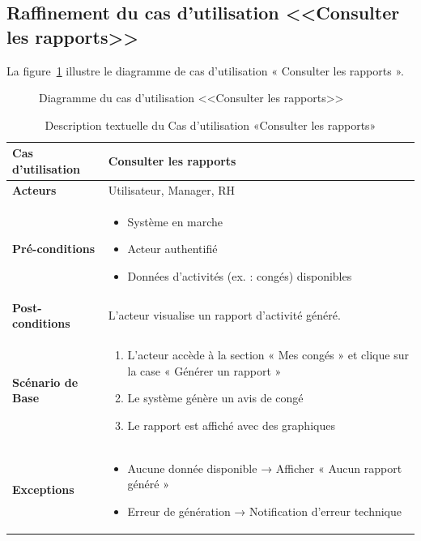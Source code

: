     \subsection{Raffinement du cas d'utilisation <<Consulter les rapports>>}
La figure~\ref{fig:rapports} illustre le diagramme de cas d’utilisation « Consulter les rapports ».
\begin{figure}[h]
    \centering
    \caption{Diagramme du cas d'utilisation <<Consulter les rapports>>}
    \label{fig:rapports}
\end{figure}
\newpage
\begin{table}[!ht]
    \centering
    \caption{Description textuelle du Cas d’utilisation «Consulter les rapports»}
    \label{tab:consult_reports}
    \renewcommand{\arraystretch}{1.2}
    \begin{tabular}{|p{4.2cm}|p{11cm}|}
    \hline
    \textbf{Cas d'utilisation} & Consulter les rapports \\
    \hline
    \textbf{Acteurs} & Utilisateur, Manager, RH \\
    \hline
    \textbf{Pré-conditions} & 
    \begin{itemize}
    \item Système en marche
    \item Acteur authentifié
    \item Données d’activités (ex. : congés) disponibles
    \end{itemize} \\
    \hline
    \textbf{Post-conditions} & L’acteur visualise un rapport d’activité généré. \\
    \hline
    \textbf{Scénario de Base} & 
    \begin{enumerate}
    \item L’acteur accède à la section « Mes congés » et clique sur la case « Générer un rapport »
    \item Le système génère un avis de congé
    \item Le rapport est affiché avec des graphiques
    \end{enumerate} \\
    \hline
    \textbf{Exceptions} & 
    \begin{itemize}
    \item Aucune donnée disponible → Afficher « Aucun rapport généré »
    \item Erreur de génération → Notification d’erreur technique
    \end{itemize} \\
    \hline
    \end{tabular}
\end{table}
